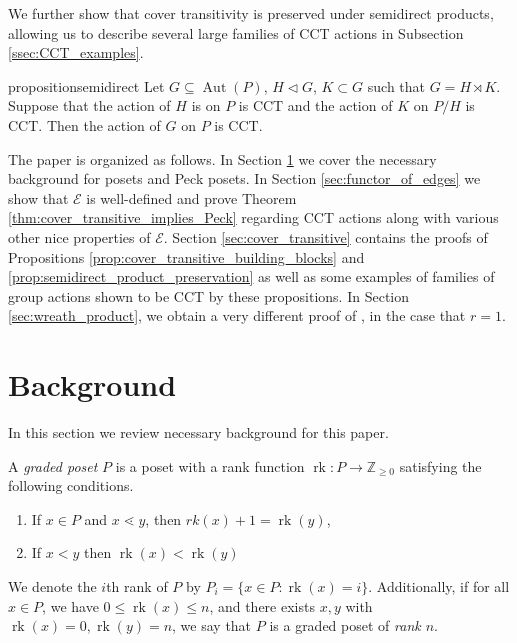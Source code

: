 \documentclass[smallextended, envcountsame, numbook]{svjour3}
\numberwithin{equation}{section}
\newcommand\rk{\operatorname{rk}}
\newcommand\Aut{\operatorname{Aut}}
\begin{document}
We further show that cover transitivity is preserved under semidirect products, allowing us to describe several large families of CCT actions in Subsection \ref{ssec:CCT_examples}.

\begin{restatable}{proposition}{semidirect}
\label{prop:semidirect_product_preservation}
Let $G\subseteq \Aut(P)$, $H\triangleleft G$, $K\subset G$ such that $G = H\rtimes K$.  Suppose that the action of $H$ is on $P$ is CCT and the action of $K$ on $P/H$ is CCT. Then the action of $G$ on $P$ is CCT.
\end{restatable}

The paper is organized as follows. In Section \ref{sec:background} we cover the necessary background for posets and Peck posets.  In Section \ref{sec:functor_of_edges} we show that $\mathcal E$ is well-defined and prove Theorem \ref{thm:cover_transitive_implies_Peck} regarding CCT actions along with various other nice properties of $\mathcal E$. Section \ref{sec:cover_transitive} contains the proofs of Propositions \ref{prop:cover_transitive_building_blocks} and \ref{prop:semidirect_product_preservation} as well as some examples of families of group actions shown to be CCT by these propositions. In Section \ref{sec:wreath_product}, we obtain a very different proof of \cite[Theorem 1.1]{pak}, in the case that $r = 1$.








\section{Background}\label{sec:background}
In this section we review necessary background for this paper. 

A {\it graded poset} $P$ is a poset with a rank function $\rk\colon P \rightarrow \mathbb Z_{\geq 0}$ satisfying the following conditions.
\begin{enumerate}
  \item If $x\in P$ and $x\lessdot y$, then $rk(x) + 1 = \rk(y)$,
  \item If $x < y$ then $\rk(x) < \rk(y)$ 
\end{enumerate}

We denote the $i$th rank of $P$ by  $P_i = \{x \in P\colon\rk(x) = i\}$. Additionally, if for all $x\in P$, we have $0 \leq \rk(x) \leq n$, and there exists $x,y$ with $\rk(x) = 0, \rk(y) = n$, we say that $P$ is a graded poset of {\it rank $n$}.
\end{document}
